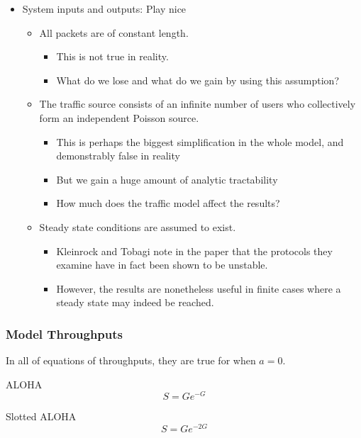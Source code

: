 \begin{itemize}[noitemsep]
\item System inputs and outputs: Play nice
  \begin{itemize}[noitemsep]
  \item All packets are of constant length.
    \begin{itemize}[noitemsep]
    \item This is not true in reality.
    \item What do we lose and what do we gain by using this assumption?
    \end{itemize}
  \item The traffic source consists of an infinite number of users who collectively form an independent Poisson source.
    \begin{itemize}[noitemsep]
    \item This is perhaps the biggest simplification in the whole model, and demonstrably false in reality
    \item But we gain a huge amount of analytic tractability
    \item How much does the traffic model affect the results?
    \end{itemize}

  \item Steady state conditions are assumed to exist.
    \begin{itemize}[noitemsep]
    \item Kleinrock and Tobagi note in the paper that the protocols they examine have in fact been shown to be unstable.
    \item However, the results are nonetheless useful in finite cases where a steady state may indeed be reached.
    \end{itemize}
  \end{itemize}
\end{itemize}

\subsubsection{Model Throughputs}\label{subsubsec:Kleinrock_Tobagi_Model_Throughputs}
In all of equations of throughputs, they are true for when $a = 0$.

ALOHA
\begin{equation}\label{eq:ALOHA_Throughput}
  S = Ge^{-G}
\end{equation}

Slotted ALOHA
\begin{equation}\label{eq:Slotted_ALOHA_Throughput}
  S = G e^{-2G}
\end{equation}

